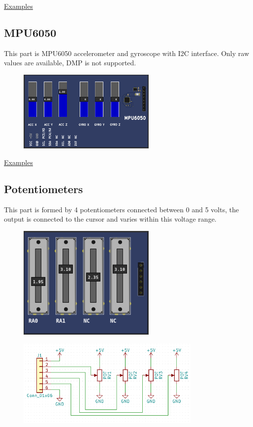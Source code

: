 \href{https://lcgamboa.github.io/picsimlab_examples/Parts.html\#LM35_(Temperature)}{Examples}


\subsection{MPU6050}

This part is MPU6050 accelerometer and gyroscope with I2C interface. 
Only raw values are available, DMP is not supported.

\begin{figure}[H]
\center
\includegraphics[width=0.6\textwidth]{img/part_mpu6050.png} 
\end{figure} 


\href{https://lcgamboa.github.io/picsimlab_examples/Parts.html\#MPU6050}{Examples}

\subsection{Potentiometers}

This part is formed by 4 potentiometers connected between 0 and 5 volts, the output is connected to the cursor and varies within this voltage range.
\begin{figure}[H]
\center
\includegraphics[width=0.6\textwidth]{img/part_pot.png} 
\end{figure} 

\begin{figure}[H]
\center
\includegraphics[width=0.8\textwidth]{img/part_pot_.png} 
\end{figure} 

